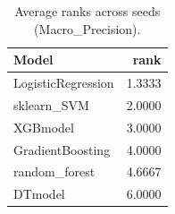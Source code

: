 \begin{table}[t]
\centering
\begin{tabular}{lr}
\toprule
Model & rank \\
\midrule
LogisticRegression & 1.3333 \\
sklearn_SVM & 2.0000 \\
XGBmodel & 3.0000 \\
GradientBoosting & 4.0000 \\
random_forest & 4.6667 \\
DTmodel & 6.0000 \\
\bottomrule
\end{tabular}
\caption{Average ranks across seeds (Macro_Precision).}
\label{tab:avg_rank_Macro_Precision}
\end{table}